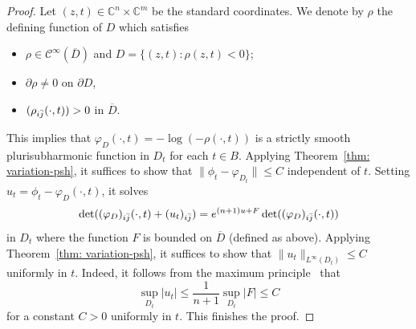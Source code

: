 \documentclass[a4paper, 11pt]{amsart}
\theoremstyle{plain}
\numberwithin{equation}{section} %
\numberwithin{figure}{section} %
\theoremstyle{plain}
\theoremstyle{plain}
\theoremstyle{plain}
\theoremstyle{plain}
\theoremstyle{remark}
\theoremstyle{definition}
\theoremstyle{definition}
\begin{document}
\begin{proof}
Let $(z,t)\in\mathbb{C}^n\times\mathbb{C}^m$ be the standard coordinates. We denote by $\rho$ the defining function of $D$ which satisfies \begin{itemize}
    \item $\rho\in\mathcal{C}^\infty(\overline D)$ and $D=\{(z,t): \rho(z,t)<0\}$;
    \item $\partial\rho\neq 0$ on $\partial D$,
    \item  $(\rho_{i\Bar j}(\cdot,t))>0$ in $\overline  D$.
\end{itemize} This implies that $\varphi_D(\cdot, t)=-\log (-\rho(\cdot, t))$ is a strictly smooth plurisubharmonic function in $D_t$ for each $t\in B$. 
Applying Theorem~\ref{thm: variation-psh}, it suffices to show that     $\|\phi_{t}-\varphi_{D_t}\|\leq C$ independent of $t$. Setting $u_t=\phi_t-\varphi_D(\cdot,t)$, it solves
\[ \det ((\varphi_D)_{i\Bar j}(\cdot, t)+(u_t)_{i\Bar j})= e^{(n+1)u+F}\det ((\varphi_D)_{i\Bar j}(\cdot, t))\] in $D_t$ where the function $F$ is bounded on $\overline D$ (defined as above). Applying Theorem~\ref{thm: variation-psh}, it suffices to show that $\|u_t\|_{L^\infty(D_t)}\leq C$ uniformly in $t$.
Indeed, it follows from the maximum principle~\cite[Proposition 4.1]{ChengYau80-complete} that $$\sup_{D_t}|u_t|\leq \frac{1}{n+1}\sup_{D_t}|F|\leq C$$ for a constant $C>0$ uniformly in $t$. This finishes the proof. 
\end{proof}

\end{document}
